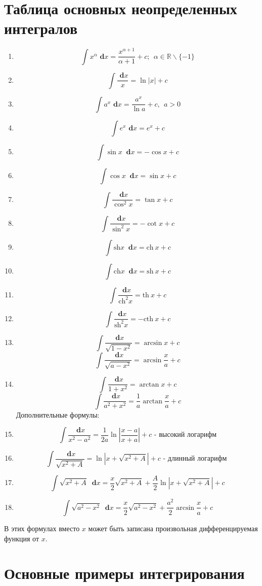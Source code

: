 \documentclass[a4paper,12pt]{bookest}
\theoremstyle{remark}
\newcommand\dx{\textbf{ d}x}
\begin{document}
\section{Таблица основных неопределенных интегралов}
\begin{enumerate}
	\item $$\int x^\alpha \dx=\frac{x^{\alpha+1}}{\alpha+1}+c;\>\>\alpha\in\mathbb{R}\backslash\{-1\}$$
	\item $$\int\frac{\dx}{x}=\ln|x|+c$$
	\item $$\int a^x\dx=\frac{a^x}{\ln a}+c,\>\>a>0$$
	\item $$\int e^x\dx=e^x+c$$
	\item $$\int\sin x\>\dx	=-\cos x+c$$
	\item $$\int\cos x\>\dx=\sin x+c$$
	\item $$\int\frac{\dx}{\cos^2x}=\tan x+c$$
	\item $$\int\frac{\dx}{\sin^2x}=-\cot x+c$$
	\item $$\int\textrm{sh}x\>\dx=\textrm{ch}\>x+c$$
	\item $$\int\textrm{ch}x\>\dx=\textrm{sh}\>x+c$$
	\item $$\int\frac{\dx}{\textrm{ch}^2x}=\textrm{th}\>x+c$$
	\item $$\int\frac{\dx}{\textrm{sh}^2x}=-\textrm{cth}\>x+c$$
	\item $$\int\frac{\dx}{\sqrt{1-x^2}}=\arcsin x+c$$
		$$\int\frac{\dx}{\sqrt{a-x^2}}=\arcsin \frac{x}{a}+c$$
	\item $$\int\frac{\dx}{1+x^2}=\arctan x+c$$
		$$\int\frac{\dx}{a^2+x^2}=\frac{1}{a}\arctan\frac{x}{a}+c$$
		Дополнительные формулы: 
	\item $$\int\frac{\dx}{x^2-a^2}=\frac{1}{2a}\ln|\frac{x-a}{x+a}|+c\textrm{ - высокий логарифм}$$ 
	\item $$\int\frac{\dx}{\sqrt{x^2+A}}=\ln|x+\sqrt{x^2+A}|+c\textrm{ - длинный логарифм }$$
	\item $$\int\sqrt{x^2+A}\>\dx=\frac{x}{2}\sqrt{x^2+A}+\frac{A}{2}\ln|x+\sqrt{x^2+A}|+c$$
	\item $$\int\sqrt{a^2-x^2}\>\dx=\frac{x}{2}\sqrt{a^2-x^2}+\frac{a^2}{2}\arcsin\frac{x}{a}+c$$
\end{enumerate}
В этих формулах вместо $x$ может быть записана произвольная дифференцируемая функция от $x$.
\section{Основные примеры интегрирования}
\end{document}
